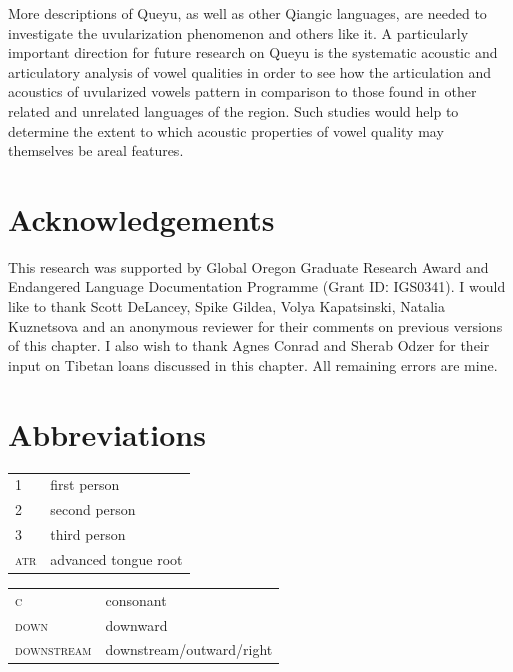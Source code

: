 \documentclass[output=paper]{langscibook}
\begin{document}
More descriptions of Queyu, as well as other Qiangic languages, are needed to investigate the uvularization phenomenon and others like it. A particularly important direction for future research on Queyu is the systematic acoustic and articulatory analysis of vowel qualities in order to see how the articulation and acoustics of uvularized vowels pattern in comparison to those found in other related and unrelated languages of the region. Such studies would help to determine the extent to which acoustic properties of vowel quality may themselves be areal features.

\section*{Acknowledgements}

This research was supported by Global Oregon Graduate Research Award and Endangered Language Documentation Programme (Grant IDː IGS0341). I would like to thank Scott DeLancey, Spike Gildea, Volya Kapatsinski, Natalia Kuznetsova and an anonymous reviewer for their comments on previous versions of this chapter. I also wish to thank Agnes Conrad and Sherab Odzer for their input on Tibetan loans discussed in this chapter. All remaining errors are mine.

\section*{Abbreviations}
\begin{tabularx}{.45\textwidth}{lQ}
1  &  first person\\
2  &  second person\\
3  &  third person\\
\textsc{atr}  &  advanced tongue root\\
\end{tabularx}
\begin{tabularx}{.45\textwidth}{lQ}
\textsc{c}      &   consonant\\
\textsc{down}  &    downward\\
\textsc{downstream} &   downstream{\slash}outward{\slash}right\\
\end{tabularx}
\end{document}
